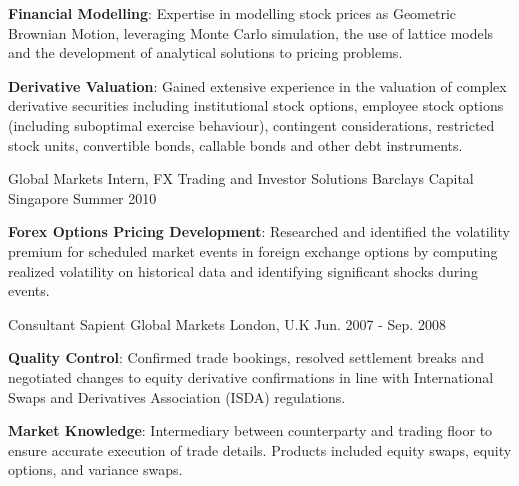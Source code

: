 \begin{cventries}
{\begin{cvitems}
        \item {\textbf{Financial Modelling}: Expertise in modelling stock prices as Geometric Brownian Motion, leveraging Monte Carlo simulation, the use of lattice models and the development of analytical solutions to pricing problems.}
        \item {\textbf{Derivative Valuation}: Gained extensive experience in the valuation of complex derivative securities including institutional stock options, employee stock options (including suboptimal exercise behaviour), contingent considerations, restricted stock units, convertible bonds, callable bonds and other debt instruments.}
      \end{cvitems}
    }
  \cventry
    {Global Markets Intern, FX Trading and Investor Solutions}
    {Barclays Capital}
    {Singapore}
    {Summer 2010}
    {
      \begin{cvitems}
        \item {\textbf{Forex Options Pricing Development}: Researched and identified the volatility premium for scheduled  
        market events in foreign exchange options by computing realized volatility on historical data and   
        identifying significant shocks during events}.
      \end{cvitems} 
    }
  \cventry
    {Consultant}
    {Sapient Global Markets}
    {London, U.K}
    {Jun. 2007 - Sep. 2008}
    {
      \begin{cvitems}
        \item {\textbf{Quality Control}: Confirmed trade bookings, resolved settlement breaks and negotiated 
        changes to equity derivative confirmations in line with International Swaps and Derivatives Association 
        (ISDA) regulations}.
        \item {\textbf{Market Knowledge}: Intermediary between counterparty and trading floor to ensure accurate execution of trade details. Products included equity swaps, equity options, and variance swaps}.
      \end{cvitems}
    }
\end{cventries}
